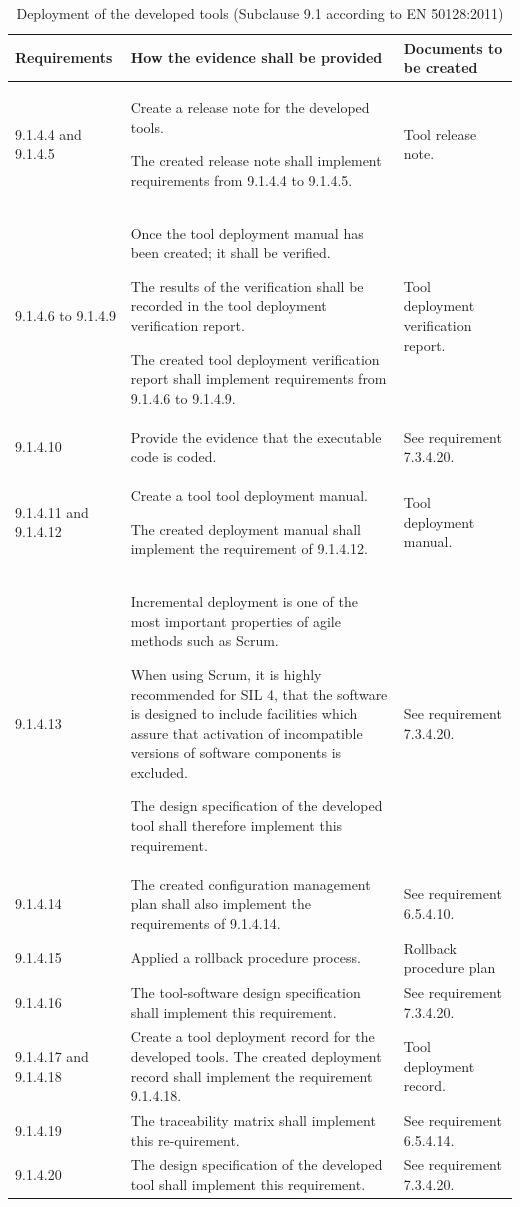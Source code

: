 \documentclass{template/openetcs_report}
\begin{document}
{\footnotesize\sffamily\centering
\begin{longtable}{|p{2cm}|p{9cm}|p{3cm}|}
\caption{Deployment of the developed tools (Subclause 9.1 according to EN 50128:2011)}\\
\hline
\bfseries Requirements & \bfseries How the evidence shall be provided & \bfseries Documents to be created\\
\hline
\hline
\endhead
\hline
\endfoot

9.1.4.4 and 9.1.4.5 & Create a release note for the developed tools.

The created release note shall implement requirements from 9.1.4.4 to 9.1.4.5.
& Tool release note.\\ 
\hline
9.1.4.6 to 9.1.4.9 & Once the tool deployment manual has been created; it shall be verified.

The results of the verification shall be recorded in the tool deployment verification report.

The created tool deployment verification report shall implement requirements from 9.1.4.6 to 9.1.4.9.
& Tool deployment verification report.\\ 
\hline
9.1.4.10 & Provide the evidence that the executable code is coded. 
& See requirement 7.3.4.20.\\ 
\hline
9.1.4.11 and 9.1.4.12 & Create a tool tool deployment manual.

The created deployment manual shall implement the requirement of 9.1.4.12.
& Tool deployment manual.\\ 
\hline
9.1.4.13 & Incremental deployment is one of the most important properties of agile methods such as Scrum.

When using Scrum, it is highly recommended for SIL 4, that the software is designed to include facilities which assure that activation of incompatible versions of software components is excluded.

The design specification of the developed tool shall therefore implement this requirement.
& See requirement 7.3.4.20.\\ 
\hline
9.1.4.14 & The created configuration management plan shall also implement the requirements of 9.1.4.14.
& See requirement 6.5.4.10.\\ 
\hline
9.1.4.15 & Applied a rollback procedure process.
& Rollback procedure plan\\ 
\hline
9.1.4.16 & The tool-software design specification shall implement this requirement.
& See requirement 7.3.4.20.\\ 
\hline
9.1.4.17 and 9.1.4.18 & Create a tool deployment record for the developed tools.
The created deployment record shall implement the requirement 9.1.4.18.
& Tool deployment record.\\ 
\hline
9.1.4.19 & The traceability matrix shall implement this re-quirement.
& See requirement 6.5.4.14.\\ 
\hline
9.1.4.20 & The design specification of the developed tool shall implement this requirement.
& See requirement 7.3.4.20.\\ 
\hline
\end{longtable}}
\end{document}
